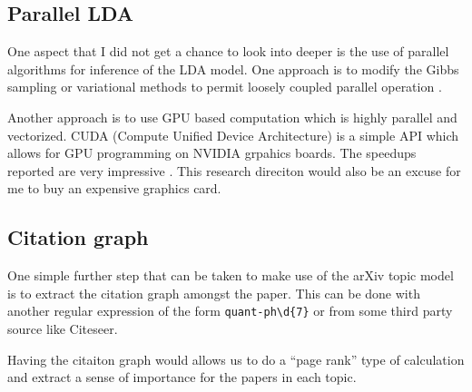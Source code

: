 \documentclass[11pt]{article}
\begin{document}
	
		
	\subsection{Parallel LDA}

        One aspect that I did not get a chance to look into deeper is the use of parallel algorithms
        for inference of the LDA model.
        One approach is to modify the Gibbs sampling or variational methods to permit loosely
        coupled parallel operation \cite{newman2006scalable,newman2007distributed}. 

        Another approach is to use GPU based computation which is highly parallel and vectorized.
        CUDA (Compute Unified Device Architecture) is a simple API which allows for GPU programming
        on NVIDIA grpahics boards. The speedups reported are very impressive
        \cite{masada2009accelerating, yan-parallel}.
        This research direciton would also be an excuse for me to buy an expensive graphics card.

			
    \subsection{Citation graph}

        One simple further step that can be taken to make use of the arXiv topic model 
        is to extract the citation graph amongst the paper. This can be done with another
        regular expression of the form \verb|quant-ph\d{7}| or from some third party
        source like Citeseer.
        
        Having the citaiton graph would allows us to do a ``page rank'' type of calculation
        and extract a sense of importance for the papers in each topic.


\end{document}
